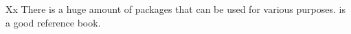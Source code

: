 \documentclass{scrbook}
\begin{document}
    Xx There is a huge amount of packages that can be used for various purposes. \citet{GMS2013a} is a good
    reference book.

    

    
\end{document}
